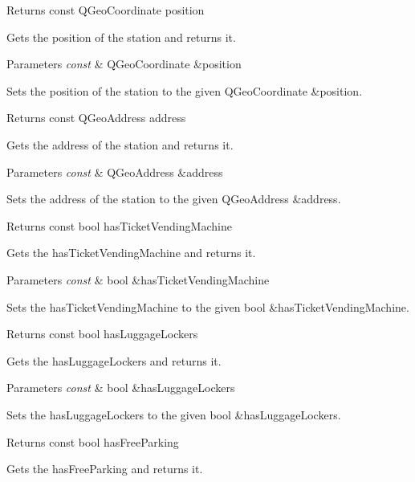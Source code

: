 \begin{DoxyReturn}{Returns}
const Q\+Geo\+Coordinate position
\end{DoxyReturn}
Gets the position of the station and returns it.


\begin{DoxyParams}{Parameters}
{\em const} & Q\+Geo\+Coordinate \&position\\
\hline
\end{DoxyParams}
Sets the position of the station to the given Q\+Geo\+Coordinate \&position.

\begin{DoxyReturn}{Returns}
const Q\+Geo\+Address address
\end{DoxyReturn}
Gets the address of the station and returns it.


\begin{DoxyParams}{Parameters}
{\em const} & Q\+Geo\+Address \&address\\
\hline
\end{DoxyParams}
Sets the address of the station to the given Q\+Geo\+Address \&address.

\begin{DoxyReturn}{Returns}
const bool has\+Ticket\+Vending\+Machine
\end{DoxyReturn}
Gets the has\+Ticket\+Vending\+Machine and returns it.


\begin{DoxyParams}{Parameters}
{\em const} & bool \&has\+Ticket\+Vending\+Machine\\
\hline
\end{DoxyParams}
Sets the has\+Ticket\+Vending\+Machine to the given bool \&has\+Ticket\+Vending\+Machine.

\begin{DoxyReturn}{Returns}
const bool has\+Luggage\+Lockers
\end{DoxyReturn}
Gets the has\+Luggage\+Lockers and returns it.


\begin{DoxyParams}{Parameters}
{\em const} & bool \&has\+Luggage\+Lockers\\
\hline
\end{DoxyParams}
Sets the has\+Luggage\+Lockers to the given bool \&has\+Luggage\+Lockers.

\begin{DoxyReturn}{Returns}
const bool has\+Free\+Parking
\end{DoxyReturn}
Gets the has\+Free\+Parking and returns it.


